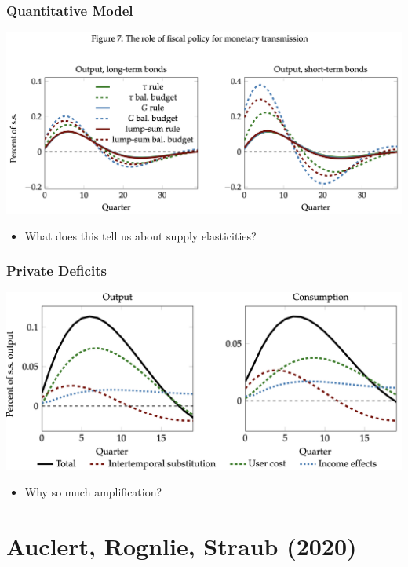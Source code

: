 \documentclass[english,xcolor=svgnames]{beamer}
\begin{document}


\begin{frame}
    \frametitle{Quantitative Model}
    \includegraphics[scale=0.3]{figures/ARSFIG7.png}
    \begin{itemize}
    	\item What does this tell us about supply elasticities?
    \end{itemize}
\end{frame}

\begin{frame}
    \frametitle{Private Deficits}
    \includegraphics[scale=0.3]{figures/ARSFIG8.png}
    \begin{itemize}
    	\item Why so much amplification?
    \end{itemize}
\end{frame}


\section{Auclert, Rognlie, Straub (2020)}
\end{document}
